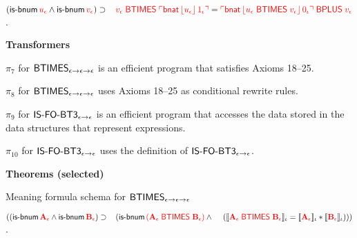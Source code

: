 \begin{biformthy}
    \item $(\mbox{\sf is-bnum} \, \textcolor{red}{u_\epsilon} \wedge 
        \mbox{\sf is-bnum} \, \textcolor{red}{v_\epsilon}) \supset {}\\
        \hspace*{2ex} \textcolor{red}{\textcolor{red}{v_\epsilon} \; \mbox{\sf BTIMES} \;
          \ulcorner\mbox{\sf bnat} \, \lfloor u_\epsilon\rfloor \, 1_\iota\urcorner} =
        \textcolor{red}{\ulcorner\mbox{\sf bnat} \, \lfloor u_\epsilon \;
              \mbox{\sf BTIMES} \; v_\epsilon\rfloor \, 0_\iota\urcorner \; \mbox{\sf BPLUS} \;
          v_\epsilon}$.


  \ee

  \item[] \textbf{Transformers}

  \be

      \setcounter{enumi}{6}

    \item $\pi_7$ for $\mbox{\sf BTIMES}_{\epsilon \rightarrow \epsilon
      \rightarrow \epsilon}$ is an efficient program that satisfies Axioms
      18--25.

    \item $\pi_8$ for $\mbox{\sf BTIMES}_{\epsilon \rightarrow \epsilon
      \rightarrow \epsilon}$ uses Axioms 18--25 as conditional rewrite
      rules.

    \item $\pi_9$ for $\mbox{\sf IS-FO-BT3}_{\epsilon \rightarrow \epsilon}$
      is an efficient program that accesses the data stored in the
      data structures that represent expressions.

    \item $\pi_{10}$ for $\mbox{\sf IS-FO-BT3}_{\epsilon \rightarrow
      \epsilon}$ uses the definition of $\mbox{\sf IS-FO-BT3}_{\epsilon
      \rightarrow \epsilon}$.

  \ee

  \item[] \textbf{Theorems (selected)}

  \be

    \setcounter{enumi}{1}

    \item Meaning formula schema for
    $\mbox{\sf BTIMES}_{\epsilon \rightarrow \epsilon \rightarrow \epsilon}$

    $((\mbox{\sf is-bnum} \, \textcolor{red}{\textbf{A}_\epsilon} \wedge 
      \mbox{\sf is-bnum} \, \textcolor{red}{\textbf{B}_\epsilon}) 
      \supset {}\\
      \hspace*{2ex}(\mbox{\sf is-bnum} \, 
      \textcolor{red}{(\textbf{A}_\epsilon \; \mbox{\sf BTIMES} \; \textbf{B}_\epsilon)} \wedge {}\\
      \hspace*{2.8ex}(\llbracket\textcolor{red}{\textbf{A}_\epsilon \; \mbox{\sf BTIMES} \; 
      \textbf{B}_\epsilon}\rrbracket_\iota = 
      \llbracket\textcolor{red}{\textbf{A}_\epsilon}\rrbracket_\iota * 
      \llbracket\textcolor{red}{\textbf{B}_\epsilon}\rrbracket_\iota)))$.

  \ee

\ei
\end{biformthy}

